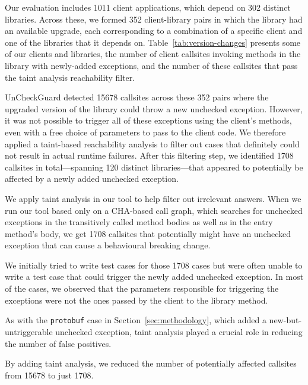 Our evaluation includes 1011 client applications, which depend on 302 distinct libraries. Across these, we formed 352 client-library pairs in which the library had an available upgrade, each corresponding to a combination of a specific client and one of the libraries that it depends on. Table~\ref{tab:version-changes} presents some of our clients and libraries, the number of client callsites invoking methods in the library with newly-added exceptions, and the number of these callsites that pass the taint analysis reachability filter.

UnCheckGuard detected 15678 callsites across these 352 pairs where the upgraded version of the library could throw a new unchecked exception. However, it was not possible to trigger all of these exceptions using the client's methods, even with a free choice of parameters to pass to the client code. We therefore applied a taint-based reachability analysis to filter out cases that definitely could not result in actual runtime failures. After this filtering step, we identified 1708 callsites in total—spanning 120 distinct libraries—that appeared to potentially be affected by a newly added unchecked exception.

We apply taint analysis in our tool to help filter out irrelevant answers. When we run our tool based only on a CHA-based call graph, which
searches for unchecked exceptions in the transitively called method bodies as well as in the entry method's body, we get
1708 callsites that potentially might have an unchecked exception that can cause a behavioural breaking change.

We initially tried to write test cases for those 1708 cases but were often unable to write a test case that could trigger
the newly added unchecked exception. In most of the cases, we observed that the parameters responsible for triggering the 
exceptions were not the ones passed by the client to the library method.

As with the \texttt{protobuf} case in Section~\ref{sec:methodology}, which added a new-but-untriggerable unchecked exception, taint analysis played a crucial role in reducing the number of false positives.

\vspace{1em}
\begin{tcolorbox}[colback=gray!10, colframe=black]
By adding taint analysis, we reduced the number of potentially affected callsites from 15678 to just 1708.
\end{tcolorbox}
\vspace{1em}

